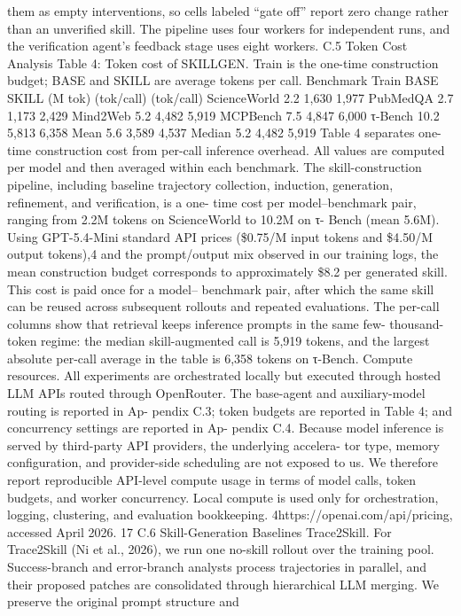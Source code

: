 them as empty interventions, so cells labeled “gate off” report zero change rather than an unverified
skill. The pipeline uses four workers for independent runs, and the verification agent’s feedback stage
uses eight workers.
C.5
Token Cost Analysis
Table 4: Token cost of SKILLGEN. Train is the one-time construction budget; BASE and SKILL are
average tokens per call.
Benchmark
Train
BASE
SKILL
(M tok)
(tok/call)
(tok/call)
ScienceWorld
2.2
1,630
1,977
PubMedQA
2.7
1,173
2,429
Mind2Web
5.2
4,482
5,919
MCPBench
7.5
4,847
6,000
τ-Bench
10.2
5,813
6,358
Mean
5.6
3,589
4,537
Median
5.2
4,482
5,919
Table 4 separates one-time construction cost from per-call inference overhead. All values are
computed per model and then averaged within each benchmark. The skill-construction pipeline,
including baseline trajectory collection, induction, generation, refinement, and verification, is a one-
time cost per model–benchmark pair, ranging from 2.2M tokens on ScienceWorld to 10.2M on τ-
Bench (mean 5.6M). Using GPT-5.4-Mini standard API prices (\$0.75/M input tokens and \$4.50/M
output tokens),4 and the prompt/output mix observed in our training logs, the mean construction
budget corresponds to approximately \$8.2 per generated skill. This cost is paid once for a model–
benchmark pair, after which the same skill can be reused across subsequent rollouts and repeated
evaluations. The per-call columns show that retrieval keeps inference prompts in the same few-
thousand-token regime: the median skill-augmented call is 5,919 tokens, and the largest absolute
per-call average in the table is 6,358 tokens on τ-Bench.
Compute resources.
All experiments are orchestrated locally but executed through hosted LLM
APIs routed through OpenRouter. The base-agent and auxiliary-model routing is reported in Ap-
pendix C.3; token budgets are reported in Table 4; and concurrency settings are reported in Ap-
pendix C.4. Because model inference is served by third-party API providers, the underlying accelera-
tor type, memory configuration, and provider-side scheduling are not exposed to us. We therefore
report reproducible API-level compute usage in terms of model calls, token budgets, and worker
concurrency. Local compute is used only for orchestration, logging, clustering, and evaluation
bookkeeping.
4https://openai.com/api/pricing, accessed April 2026.
17
C.6
Skill-Generation Baselines
Trace2Skill.
For Trace2Skill (Ni et al., 2026), we run one no-skill rollout over the training pool.
Success-branch and error-branch analysts process trajectories in parallel, and their proposed patches
are consolidated through hierarchical LLM merging. We preserve the original prompt structure and

